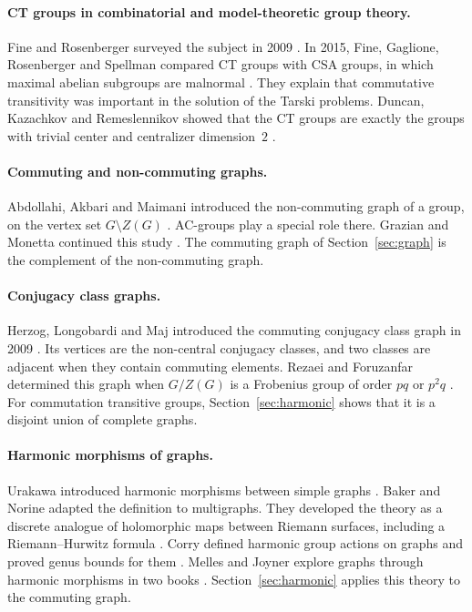 \documentclass[12pt,letterpaper]{article}
\numberwithin{equation}{section}
\theoremstyle{plain}
\theoremstyle{definition}
\begin{document}
\paragraph{CT groups in combinatorial and model-theoretic group theory.}
Fine and Rosenberger surveyed the subject in 2009 \cite{FR09}. In 2015, Fine, Gaglione, Rosenberger and Spellman
compared CT groups with CSA groups, in which maximal abelian subgroups are
malnormal \cite{FGRS15}. They explain that commutative transitivity was
important in the solution of the Tarski problems. Duncan, Kazachkov and
Remeslennikov showed that the CT groups are exactly the groups with
trivial center and centralizer dimension~$2$ \cite{DKR05}.

\paragraph{Commuting and non-commuting graphs.} Abdollahi, Akbari and
Maimani introduced the non-commuting graph of a group, on the vertex set
$G\setminus Z(G)$ \cite{AAM06}. AC-groups play a special role there. Grazian
and Monetta continued this study \cite{GM23}. The commuting graph of
Section~\ref{sec:graph} is the complement of the non-commuting graph.

\paragraph{Conjugacy class graphs.} Herzog, Longobardi and Maj introduced
the commuting conjugacy class graph in 2009 \cite{HLM09}. Its vertices are
the non-central conjugacy classes, and two classes are adjacent when they
contain commuting elements. Rezaei and Foruzanfar determined this graph when
$G/Z(G)$ is a Frobenius group of order $pq$ or $p^2q$ \cite{RF23}. For
commutation transitive groups, Section~\ref{sec:harmonic} shows that it is a
disjoint union of complete graphs.

\paragraph{Harmonic morphisms of graphs.} Urakawa introduced harmonic
morphisms between simple graphs \cite{Ur00}. Baker and Norine adapted the
definition to multigraphs. They developed the theory as a discrete analogue
of holomorphic maps between Riemann surfaces, including a Riemann--Hurwitz
formula \cite{BN09}. Corry defined harmonic group actions on graphs and
proved genus bounds for them \cite{Co10}. Melles and Joyner explore graphs
through harmonic morphisms in two books \cite{JM17,MJ26}.
Section~\ref{sec:harmonic} applies this theory to the commuting graph.
\end{document}
